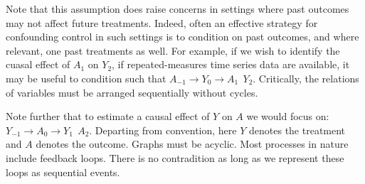 \documentclass[
  single column]{article}
\begin{document}
Note that this assumption does raise concerns in settings where past
outcomes may not affect future treatments. Indeed, often an effective
strategy for confounding control in such settings is to condition on
past outcomes, and where relevant, one past treatments as well. For
example, if we wish to identify the cuasal effect of \(A_1\) on \(Y_2\),
if repeated-measures time series data are available, it may be useful to
condition such that \(\boxed{A_{-1}} \to \boxed{Y_0} \to A_1 ~~ Y_2\).
Critically, the relations of variables must be arranged sequentially
without cycles.

Note further that to estimate a causal effect of \(Y\) on \(A\) we would
focus on: \(\boxed{Y_{-1}} \to \boxed{A_0} \to Y_1 ~~ A_2\). Departing
from convention, here \(Y\) denotes the treatment and \(A\) denotes the
outcome. Graphs must be acyclic. Most processes in nature include
feedback loops. There is no contradition as long as we represent these
loops as sequential events.
\end{document}
